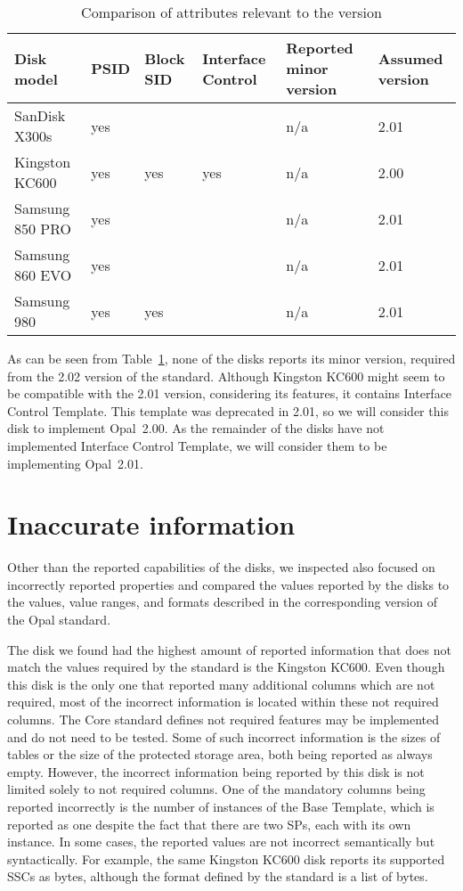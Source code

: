 \begin{table}
\small
\begin{tabularx}{\textwidth}{lXXXXX}
\toprule
  Disk model & PSID & Block SID & Interface Control & Reported minor version & Assumed version \\
\midrule
SanDisk X300s       & yes &     &     & n/a & 2.01       \\
Kingston KC600      & yes & yes & yes & n/a & 2.00       \\
Samsung 850 PRO     & yes &     &     & n/a & 2.01       \\
Samsung 860 EVO     & yes &     &     & n/a & 2.01       \\
Samsung 980         & yes & yes &     & n/a & 2.01       \\ 
\bottomrule
\end{tabularx}
\caption{Comparison of attributes relevant to the version}
\label{table:compare_versions}
\end{table}

As can be seen from Table~\ref{table:compare_versions}, none of the disks reports its minor version, required from the 2.02 version of the standard.
Although Kingston KC600 might seem to be compatible with the 2.01 version, considering its features, it contains Interface Control Template. This template was deprecated in 2.01, so we will consider this disk to implement Opal~2.00.
As the remainder of the disks have not implemented Interface Control Template, we will consider them to be implementing Opal~2.01.

\section{Inaccurate information}

Other than the reported capabilities of the disks, we inspected also focused on incorrectly reported properties and compared the values reported by the disks to the values, value ranges, and formats described in the corresponding version of the Opal standard. 

The disk we found had the highest amount of reported information that does not match the values required by the standard is the Kingston KC600. 
Even though this disk is the only one that reported many additional columns which are not required, most of the incorrect information is located within these not required columns.
The Core standard defines not required features may be implemented and do not need to be tested.
Some of such incorrect information is the sizes of tables or the size of the protected storage area, both being reported as always empty.
However, the incorrect information being reported by this disk is not limited solely to not required columns. One of the mandatory columns being reported incorrectly is the number of instances of the Base Template, which is reported as one despite the fact that there are two SPs, each with its own instance. 
In some cases, the reported values are not incorrect semantically but syntactically. For example, the same Kingston KC600 disk reports its supported SSCs as bytes, although the format defined by the standard is a list of bytes.

